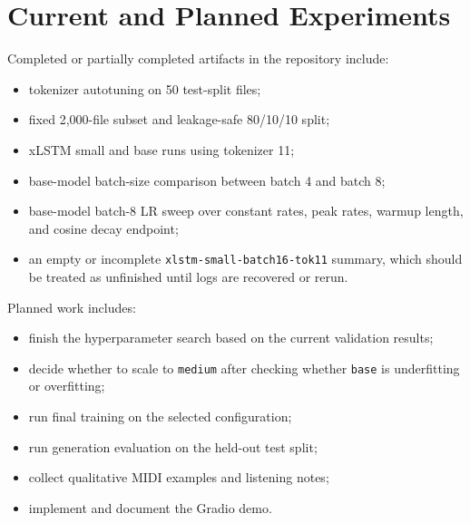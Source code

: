 \section{Current and Planned Experiments}

Completed or partially completed artifacts in the repository include:
\begin{itemize}
	\item tokenizer autotuning on 50 test-split files;
	\item fixed 2,000-file subset and leakage-safe 80/10/10 split;
	\item xLSTM small and base runs using tokenizer 11;
	\item base-model batch-size comparison between batch 4 and batch 8;
	\item base-model batch-8 LR sweep over constant rates, peak rates, warmup length, and cosine decay endpoint;
	\item an empty or incomplete \verb|xlstm-small-batch16-tok11| summary, which should be treated as unfinished until logs are recovered or rerun.
\end{itemize}

Planned work includes:
\begin{itemize}
	\item finish the hyperparameter search based on the current validation results;
	\item decide whether to scale to \verb|medium| after checking whether \verb|base| is underfitting or overfitting;
	\item run final training on the selected configuration;
	\item run generation evaluation on the held-out test split;
	\item collect qualitative MIDI examples and listening notes;
	\item implement and document the Gradio demo.
\end{itemize}

